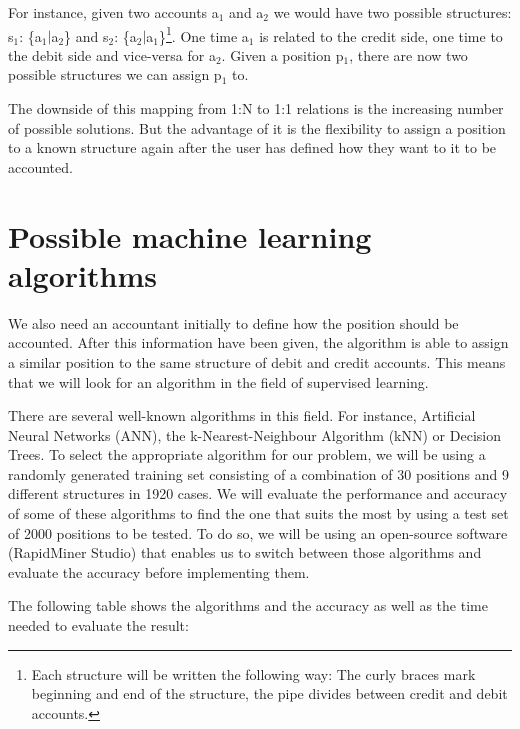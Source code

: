 For instance, given two accounts a$_1$ and a$_2$ we would have two possible structures: s$_1$: \{a$_1$$|$a$_2$\} and s$_2$: \{a$_2$$|$a$_1$\}\footnote{Each structure will be written the following way: The curly braces mark beginning and end of the structure, the pipe divides between credit and debit accounts.}. One time a$_1$ is related to the credit side, one time to the debit side and vice-versa for a$_2$. Given a position p$_1$, there are now two possible structures we can assign p$_1$ to.

The downside of this mapping from 1:N to 1:1 relations is the increasing number of possible solutions. But the advantage of it is the flexibility to assign a position to a known structure again after the user has defined how they want to it to be accounted.

\section{Possible machine learning algorithms}
\label{sec4.2}
We also need an accountant initially to define how the position should be accounted. After this information have been given, the algorithm is able to assign a similar position to the same structure of debit and credit accounts. This means that we will look for an algorithm in the field of supervised learning.

There are several well-known algorithms in this field. For instance, Artificial Neural Networks (ANN), the k-Nearest-Neighbour Algorithm (kNN) or Decision Trees. To select the appropriate algorithm for our problem, we will be using a randomly generated training set consisting of a combination of 30 positions and 9 different structures in 1920 cases. We will evaluate the performance and accuracy of some of these algorithms to find the one that suits the most by using a test set of 2000 positions to be tested. To do so, we will be using an open-source software (RapidMiner Studio) that enables us to switch between those algorithms and evaluate the accuracy before implementing them.

The following table shows the algorithms and the accuracy as well as the time needed to evaluate the result:

\begin{table}[!htb]
\centering
{}
\caption{Accuracy of different Machine Learning algorithms}
\label{mlAccuracy}
\end{table}

